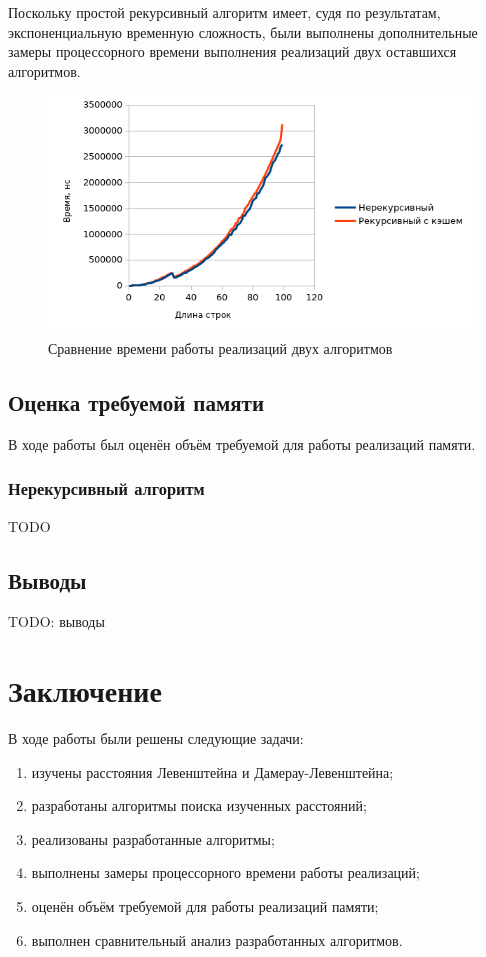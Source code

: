 \documentclass{report}
\begin{document}
Поскольку простой рекурсивный алгоритм имеет, судя по результатам,
экспоненциальную временную сложность, были выполнены дополнительные
замеры процессорного времени выполнения реализаций двух оставшихся
алгоритмов.

\begin{figure}[ht]
    \centering
    \includegraphics[width=\textwidth]{plt-02.png}
    \caption{Сравнение времени работы реализаций двух алгоритмов}
\end{figure}

\section{Оценка требуемой памяти}

В ходе работы был оценён объём требуемой для работы реализаций
памяти.

\subsection{Нерекурсивный алгоритм}

TODO

\section{Выводы}

TODO: выводы

\chapter*{Заключение}

В ходе работы были решены следующие задачи:

\begin{enumerate}
    \item изучены расстояния Левенштейна и Дамерау-Левенштейна;
    \item разработаны алгоритмы поиска изученных расстояний;
    \item реализованы разработанные алгоритмы;
    \item выполнены замеры процессорного времени работы реализаций;
    \item оценён объём требуемой для работы реализаций памяти;
    \item выполнен сравнительный анализ разработанных алгоритмов.
\end{enumerate}
\end{document}
